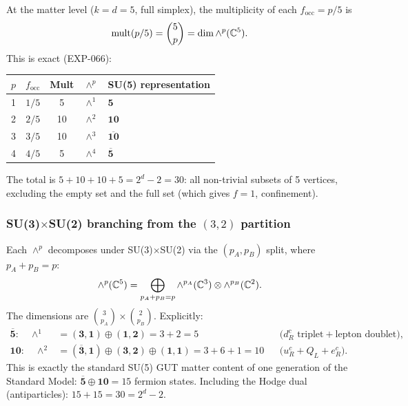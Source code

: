 At the matter level ($k = d = 5$, full simplex), the multiplicity of each $f_\mathrm{occ} = p/5$ is
\begin{equation}
\mathrm{mult}(p/5) = \binom{5}{p} = \dim \wedge^p(\mathbb{C}^5).
\end{equation}
This is exact (EXP-066):
\begin{center}
\begin{tabular}{ccccl}
\hline
$p$ & $f_\mathrm{occ}$ & Mult & $\wedge^p$ & SU(5) representation \\
\hline
1 & $1/5$ & 5 & $\wedge^1$ & $\mathbf{5}$ \\
2 & $2/5$ & 10 & $\wedge^2$ & $\mathbf{10}$ \\
3 & $3/5$ & 10 & $\wedge^3$ & $\overline{\mathbf{10}}$ \\
4 & $4/5$ & 5 & $\wedge^4$ & $\overline{\mathbf{5}}$ \\
\hline
\end{tabular}
\end{center}
The total is $5 + 10 + 10 + 5 = 2^d - 2 = 30$: all non-trivial subsets of 5 vertices, excluding the empty set and the full set (which gives $f = 1$, confinement).

\subsubsection{SU(3)$\times$SU(2) branching from the $(3,2)$ partition}

Each $\wedge^p$ decomposes under SU(3)$\times$SU(2) via the $(p_A, p_B)$ split, where $p_A + p_B = p$:
\begin{equation}
\wedge^p(\mathbb{C}^5) = \bigoplus_{p_A + p_B = p} \wedge^{p_A}(\mathbb{C}^3) \otimes \wedge^{p_B}(\mathbb{C}^2).
\end{equation}
The dimensions are $\binom{3}{p_A} \times \binom{2}{p_B}$.  Explicitly:
\begin{align}
\overline{\mathbf{5}}: \quad \wedge^1 &= (\mathbf{3},\mathbf{1}) \oplus (\mathbf{1},\mathbf{2}) = 3 + 2 = 5
&&\text{(}d_R^c \text{ triplet} + \text{lepton doublet),} \\
\mathbf{10}: \quad \wedge^2 &= (\overline{\mathbf{3}},\mathbf{1}) \oplus (\mathbf{3},\mathbf{2}) \oplus (\mathbf{1},\mathbf{1}) = 3 + 6 + 1 = 10
&&\text{(}u_R^c + Q_L + e_R^c\text{).}
\end{align}
This is exactly the standard SU(5) GUT matter content of one generation of the Standard Model: $\overline{\mathbf{5}} \oplus \mathbf{10} = 15$ fermion states.  Including the Hodge dual (antiparticles): $15 + 15 = 30 = 2^d - 2$.

